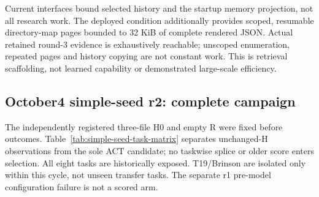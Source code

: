 Current interfaces bound selected history and the startup memory projection,
not all research work. The deployed condition additionally
provides scoped, resumable directory-map pages bounded to 32 KiB of complete
rendered JSON. Actual retained round-3 evidence is exhaustively reachable;
unscoped enumeration, repeated pages and history copying are not constant
work. This is retrieval scaffolding, not learned capability or demonstrated
large-scale efficiency.

\subsection{October4 simple-seed r2: complete campaign}
\label{sec:simple-seed-results}

The independently registered three-file H0 and empty R were fixed before
outcomes. Table~\ref{tab:simple-seed-task-matrix} separates unchanged-H
observations from the sole ACT candidate; no taskwise splice or older score
enters selection. All eight tasks are historically exposed. T19/Brinson are
isolated only within this cycle, not unseen transfer tasks. The separate r1
pre-model configuration failure is not a scored arm.

